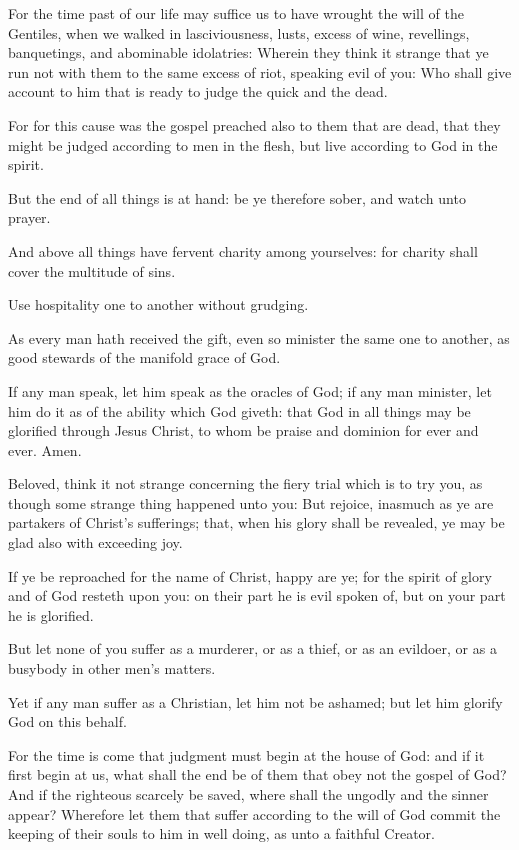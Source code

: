 \Verse For the time past of our life may suffice us to have wrought the will of the Gentiles, when we walked in lasciviousness, lusts, excess of wine, revellings, banquetings, and abominable idolatries: \Verse Wherein they think it strange that ye run not with them to the same excess of riot, speaking evil of you: \Verse Who shall give account to him that is ready to judge the quick and the dead.

\Verse For for this cause was the gospel preached also to them that are dead, that they might be judged according to men in the flesh, but live according to God in the spirit.

\Verse But the end of all things is at hand: be ye therefore sober, and watch unto prayer.

\Verse And above all things have fervent charity among yourselves: for charity shall cover the multitude of sins.

\Verse Use hospitality one to another without grudging.

\Verse As every man hath received the gift, even so minister the same one to another, as good stewards of the manifold grace of God.

\Verse If any man speak, let him speak as the oracles of God; if any man minister, let him do it as of the ability which God giveth: that God in all things may be glorified through Jesus Christ, to whom be praise and dominion for ever and ever. Amen.

\Verse Beloved, think it not strange concerning the fiery trial which is to try you, as though some strange thing happened unto you: \Verse But rejoice, inasmuch as ye are partakers of Christ's sufferings; that, when his glory shall be revealed, ye may be glad also with exceeding joy.

\Verse If ye be reproached for the name of Christ, happy are ye; for the spirit of glory and of God resteth upon you: on their part he is evil spoken of, but on your part he is glorified.

\Verse But let none of you suffer as a murderer, or as a thief, or as an evildoer, or as a busybody in other men's matters.

\Verse Yet if any man suffer as a Christian, let him not be ashamed; but let him glorify God on this behalf.

\Verse For the time is come that judgment must begin at the house of God: and if it first begin at us, what shall the end be of them that obey not the gospel of God?  \Verse And if the righteous scarcely be saved, where shall the ungodly and the sinner appear?  \Verse Wherefore let them that suffer according to the will of God commit the keeping of their souls to him in well doing, as unto a faithful Creator.


